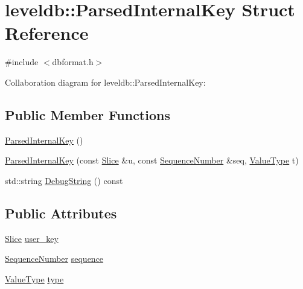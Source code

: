 \hypertarget{structleveldb_1_1_parsed_internal_key}{}\section{leveldb\+:\+:Parsed\+Internal\+Key Struct Reference}
\label{structleveldb_1_1_parsed_internal_key}


{\ttfamily \#include $<$dbformat.\+h$>$}



Collaboration diagram for leveldb\+:\+:Parsed\+Internal\+Key\+:
\subsection*{Public Member Functions}
\begin{DoxyCompactItemize}
\item 
\hyperlink{structleveldb_1_1_parsed_internal_key_a23885ae8c8ccb36e01cdb3469ea21d67}{Parsed\+Internal\+Key} ()
\item 
\hyperlink{structleveldb_1_1_parsed_internal_key_acc24f6ddeb4223d0484613076a48a9a1}{Parsed\+Internal\+Key} (const \hyperlink{classleveldb_1_1_slice}{Slice} \&u, const \hyperlink{namespaceleveldb_a5481ededd221c36d652c371249f869fa}{Sequence\+Number} \&seq, \hyperlink{namespaceleveldb_acc038cb0d608414730cafa459a4ba866}{Value\+Type} t)
\item 
std\+::string \hyperlink{structleveldb_1_1_parsed_internal_key_abda4655ea6857f75dcb8f409873207d5}{Debug\+String} () const 
\end{DoxyCompactItemize}
\subsection*{Public Attributes}
\begin{DoxyCompactItemize}
\item 
\hyperlink{classleveldb_1_1_slice}{Slice} \hyperlink{structleveldb_1_1_parsed_internal_key_aa6e30fcf3c95fc1485d60fa08efe2b9d}{user\+\_\+key}
\item 
\hyperlink{namespaceleveldb_a5481ededd221c36d652c371249f869fa}{Sequence\+Number} \hyperlink{structleveldb_1_1_parsed_internal_key_a3ab7f4382bc026081875fde4dea95e61}{sequence}
\item 
\hyperlink{namespaceleveldb_acc038cb0d608414730cafa459a4ba866}{Value\+Type} \hyperlink{structleveldb_1_1_parsed_internal_key_ac7c10a6f60f93982b886ad1fbbafd6c2}{type}
\end{DoxyCompactItemize}


